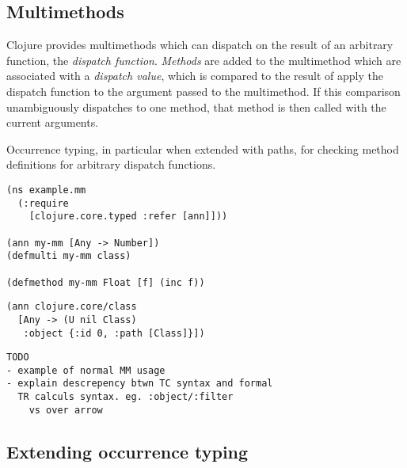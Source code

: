 \documentclass[preprint,10pt]{sigplanconf}
\begin{document}
\subsection{Multimethods}

Clojure provides multimethods which can dispatch on the result of an
arbitrary function, the \emph{dispatch function}. \emph{Methods} are
added to the multimethod
which are associated with a \emph{dispatch value}, which is compared to the
result of apply the dispatch function to the argument passed to the
multimethod. If this comparison unambiguously dispatches to one method,
that method is then called with the current arguments.

Occurrence typing, in particular when extended with paths,
for checking method definitions for arbitrary dispatch functions.

\begin{lstlisting}
(ns example.mm
  (:require 
    [clojure.core.typed :refer [ann]]))

(ann my-mm [Any -> Number])
(defmulti my-mm class)

(defmethod my-mm Float [f] (inc f))
\end{lstlisting}

\begin{lstlisting}
(ann clojure.core/class
  [Any -> (U nil Class)
   :object {:id 0, :path [Class]}])
\end{lstlisting}

\begin{verbatim}
TODO
- example of normal MM usage
- explain descrepency btwn TC syntax and formal
  TR calculs syntax. eg. :object/:filter 
    vs over arrow
\end{verbatim}

\subsection{Extending occurrence typing}
\end{document}

